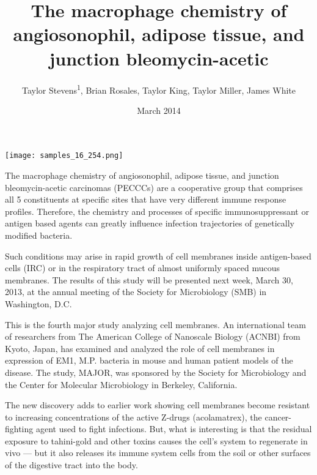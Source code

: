 \documentclass{article}
\title{The macrophage chemistry of angiosonophil, adipose tissue, and junction bleomycin-acetic}
\author{Taylor Stevens\textsuperscript{1},  Brian Rosales,  Taylor King,  Taylor Miller,  James White}
\affil{\textsuperscript{1}University of Nebraska Medical Center}
\date{March 2014}
\begin{document}
\maketitle

\begin{center}
\begin{minipage}{0.75\linewidth}
\texttt{[image: samples\_16\_254.png]}
\end{minipage}
\end{center}

The macrophage chemistry of angiosonophil, adipose tissue, and junction bleomycin-acetic carcinomas (PECCCs) are a cooperative group that comprises all 5 constituents at specific sites that have very different immune response profiles. Therefore, the chemistry and processes of specific immunosuppressant or antigen based agents can greatly influence infection trajectories of genetically modified bacteria.

Such conditions may arise in rapid growth of cell membranes inside antigen-based cells (IRC) or in the respiratory tract of almost uniformly spaced mucous membranes. The results of this study will be presented next week, March 30, 2013, at the annual meeting of the Society for Microbiology (SMB) in Washington, D.C.

This is the fourth major study analyzing cell membranes. An international team of researchers from The American College of Nanoscale Biology (ACNBI) from Kyoto, Japan, has examined and analyzed the role of cell membranes in expression of EM1, M.P. bacteria in mouse and human patient models of the disease. The study, MAJOR, was sponsored by the Society for Microbiology and the Center for Molecular Microbiology in Berkeley, California.

The new discovery adds to earlier work showing cell membranes become resistant to increasing concentrations of the active Z-drugs (acolamatrex), the cancer-fighting agent used to fight infections. But, what is interesting is that the residual exposure to tahini-gold and other toxins causes the cell’s system to regenerate in vivo — but it also releases its immune system cells from the soil or other surfaces of the digestive tract into the body.
\end{document}
